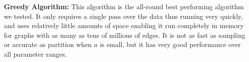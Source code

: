 \textbf{Greedy Algorithm:} This algorithm is the all-round best performing algorithm we tested.
It only requires a single pass over the data thus running very quickly,  and uses
relatively little amounts of space enabling it run completely in memory for graphs with
as many as tens of millions of edges. It is not as fast as sampling or accurate as partition
when $a$ is small, but it has very good performance over all parameter ranges. 

